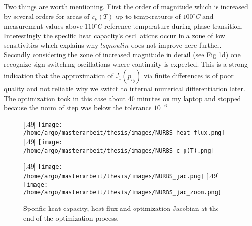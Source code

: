 \documentclass{scrartcl}[12pt, halfparskip]
\numberwithin{equation}{section}
\numberwithin{figure}{section}
\numberwithin{table}{section}
\begin{document}
Two things are worth mentioning. First the order of magnitude which is increased by several orders for areas of $c_p(T)$ up to temperatures of $100^\circ C$ and measurement values above $110^\circ C$ reference temperature during phase transition. Interestingly the specific heat capacity's oscillations occur in a zone of low sensitivities which explains why $lsqnonlin$ does not improve here further. 
Secondly considering the zone of increased magnitude in detail (see Fig \ref{fig:NURBS_results}d) one recognize sign switching oscillations where continuity is expected. This is a strong indication that the approximation of $J_1(p_{c_p})$ via finite differences is of poor quality and not reliable why we switch to internal numerical differentiation later. \\
The optimization took in this case about 40 minutes on my laptop and stopped because the norm of step was below the tolerance $10^{-6}$.


\begin{figure}[H]
	[.49\linewidth]
	{\texttt{[image: /home/argo/masterarbeit/thesis/images/NURBS\_heat\_flux.png]}}
	[.49\linewidth]
	{\texttt{[image: /home/argo/masterarbeit/thesis/images/NURBS\_c\_p(T).png]}}

	[.49\linewidth]
	{\texttt{[image: /home/argo/masterarbeit/thesis/images/NURBS\_jac.png]}}
	\hspace{0.5cm}
	[.49\linewidth]
	{\texttt{[image: /home/argo/masterarbeit/thesis/images/NURBS\_jac\_zoom.png]}}
	\caption{Specific heat capacity, heat flux and optimization Jacobian at the end of the optimization process.}
	\label{fig:NURBS_results}
\end{figure}
\end{document}

